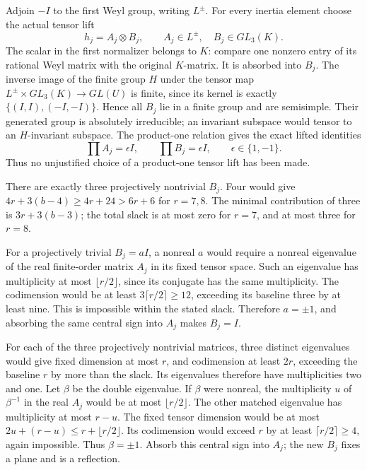 Adjoin \(-I\) to the first Weyl group, writing \(L^\pm\).
For every inertia element choose the actual tensor lift
\[
                   h_j=A_j\otimes B_j,\qquad
                   A_j\in L^\pm,\quad B_j\in GL_3(K).
                                                               \tag{S45.7}
\]
The scalar in the first normalizer belongs to \(K\):
compare one nonzero entry of its rational Weyl matrix with
the original \(K\)-matrix. It is absorbed into \(B_j\).
The inverse image of the finite group \(H\) under the
tensor map \(L^\pm\times GL_3(K)\to GL(U)\) is finite,
since its kernel is exactly
\(\{(I,I),(-I,-I)\}\). Hence all \(B_j\) lie in a
finite group and are semisimple. Their generated group is
absolutely irreducible; an invariant subspace would tensor
to an \(H\)-invariant subspace. The product-one relation
gives the exact lifted identities
\[
            \prod A_j=\epsilon I,\qquad
            \prod B_j=\epsilon I,\qquad \epsilon\in\{1,-1\}.
                                                               \tag{S45.8}
\]
Thus no unjustified choice of a product-one tensor lift
has been made.

There are exactly three projectively nontrivial \(B_j\).
Four would give \(4r+3(b-4)\ge4r+24>6r+6\) for
\(r=7,8\). The minimal contribution of three is
\(3r+3(b-3)\); the total slack is at most zero for
\(r=7\), and at most three for \(r=8\).

For a projectively trivial \(B_j=aI\), a nonreal \(a\)
would require a nonreal eigenvalue of the real finite-order
matrix \(A_j\) in its fixed tensor space. Such an eigenvalue
has multiplicity at most \(\lfloor r/2\rfloor\), since
its conjugate has the same multiplicity. The codimension
would be at least \(3\lceil r/2\rceil\ge12\), exceeding
its baseline three by at least nine. This is impossible
within the stated slack. Therefore \(a=\pm1\), and
absorbing the same central sign into \(A_j\) makes \(B_j=I\).

For each of the three projectively nontrivial matrices, three
distinct eigenvalues would give fixed dimension at most \(r\),
and codimension at least \(2r\), exceeding the baseline \(r\)
by more than the slack. Its eigenvalues therefore have
multiplicities two and one. Let \(\beta\) be the double
eigenvalue. If \(\beta\) were nonreal, the multiplicity \(u\)
of \(\beta^{-1}\) in the real \(A_j\) would be at most
\(\lfloor r/2\rfloor\). The other matched eigenvalue has
multiplicity at most \(r-u\). The fixed tensor dimension
would be at most \(2u+(r-u)\le r+\lfloor r/2\rfloor\).
Its codimension would exceed \(r\) by at least
\(\lceil r/2\rceil\ge4\), again impossible.
Thus \(\beta=\pm1\). Absorb this central sign into \(A_j\);
the new \(B_j\) fixes a plane and is a reflection.

